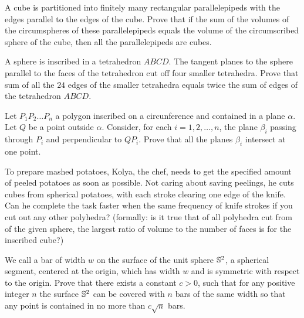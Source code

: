 \begin{question}[name={1995 Romania TST}]
	A cube is partitioned into finitely many rectangular parallelepipeds with the edges parallel to the edges of the cube. Prove that if the sum of the volumes of the circumspheres of these parallelepipeds equals the volume of the circumscribed sphere of the cube, then all the parallelepipeds are cubes.
\end{question}


\begin{question}[name={1998 Czech and Slovak}]
	A sphere is inscribed in a tetrahedron $ABCD$. The tangent planes to the sphere parallel to the faces of the tetrahedron cut off four smaller tetrahedra. Prove that sum of all the $24$ edges of the smaller tetrahedra equals twice the sum of edges of the tetrahedron $ABCD$.
\end{question}




\begin{question}[name={1993 Brazil}]
	Let $P_1P_2 \dots P_n$ a polygon inscribed on a circunference and contained in a plane $\alpha$. Let $Q$ be a point outside $\alpha$. Consider, for each $i=1,2, \dots ,n$, the plane $\beta_i$ passing through $P_i$ and perpendicular to $QP_i$. Prove that all the planes $\beta_i$ intersect at one point.
\end{question}




\begin{question}[name={2015 Kurchatov Olympiad}]
	To prepare mashed potatoes, Kolya, the chef, needs to get the specified amount of peeled potatoes as soon as possible. Not caring about saving peelings, he cuts cubes from spherical potatoes, with each stroke clearing one edge of the knife. Can he complete the task faster when the same frequency of knife strokes if you cut out any other polyhedra? (formally: is it true that of all polyhedra cut from of the given sphere, the largest ratio of volume to the number of faces is for the inscribed cube?)
\end{question}





\begin{question}[name={2015 Miklos Schweitzer}]
	We call a bar of width ${w}$ on the surface of the unit sphere ${\Bbb{S}^2}$, a spherical segment, centered at the origin, which has width ${w}$ and is symmetric with respect to the origin.
	Prove that there exists a constant ${c>0}$, such that for any positive integer ${n}$ the surface ${\Bbb{S}^2}$ can be covered with ${n}$ bars of the same width so that any point is contained in no more than ${c\sqrt{n}}$ bars.
\end{question}




